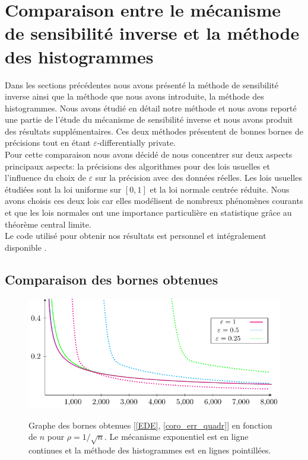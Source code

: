 \section{Comparaison entre le mécanisme de sensibilité inverse et la méthode des histogrammes}


Dans les sections précédentes nous avons présenté la méthode de sensibilité inverse ainsi que la méthode que nous avons introduite, la méthode des histogrammes. Nous avons étudié en détail notre méthode et nous avons reporté une partie de l'étude du mécanisme de sensibilité inverse et nous avons produit des résultats supplémentaires. Ces deux méthodes présentent de bonnes bornes de précisions tout en étant \(\varepsilon\)-differentially private.\\

Pour cette comparaison nous avons décidé de nous concentrer sur deux aspects principaux aspects: la précisions des algorithmes pour des lois usuelles et l'influence du choix de \(\varepsilon\) sur la précision avec des données réelles. Les lois usuelles étudiées sont la loi uniforme sur \([0,1]\) et la loi normale centrée réduite. Nous avons choisis ces deux lois car elles modélisent de nombreux phénomènes courants et que les lois normales ont une importance particulière en statistique grâce au théorème central limite.\\

Le code utilisé pour obtenir nos résultats est personnel et intégralement disponible \cite{git}.

\subsection{Comparaison des bornes obtenues}

\begin{figure}[H]
    \centering
    \includegraphics[]{"./proofs/figures/u1Me9JP1u1pCrW1j.pdf"}
    \label{bcomp}
    \caption{Graphe des bornes obtenues [\ref{EDE}, \ref{coro_err_quadr}] en fonction de \(n\) pour \(\rho = 1/\sqrt n\). Le mécanisme exponentiel est en ligne continues et la méthode des histogrammes est en lignes pointillées.}
\end{figure}

